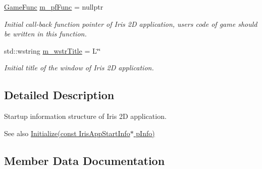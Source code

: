 \begin{DoxyCompactItemize}
\mbox{\label{struct_iris2_d_1_1_iris_application_1_1_iris_app_start_info_a33e7344a1e119e2db1e1a185dd1174f0}} 
\hyperlink{class_iris2_d_1_1_iris_application_ac74720e6cd3a1968f73e92ea99675884}{Game\+Func} \hyperlink{struct_iris2_d_1_1_iris_application_1_1_iris_app_start_info_a33e7344a1e119e2db1e1a185dd1174f0}{m\+\_\+pf\+Func} = nullptr
\begin{DoxyCompactList}\small\item\em Initial call-\/back function pointer of Iris 2D application, user\textquotesingle{}s code of game should be written in this function. \end{DoxyCompactList}\item 
std\+::wstring \hyperlink{struct_iris2_d_1_1_iris_application_1_1_iris_app_start_info_a18a045ecc35ff343a38da429c2e59cdf}{m\+\_\+wstr\+Title} = L\char`\"{}\char`\"{}
\begin{DoxyCompactList}\small\item\em Initial title of the window of Iris 2D application. \end{DoxyCompactList}\end{DoxyCompactItemize}


\subsection{Detailed Description}
Startup information structure of Iris 2D application. 

\begin{DoxySeeAlso}{See also}
\hyperlink{class_iris2_d_1_1_iris_application_ac20656815694f980fccfc4369727a9a9}{Initialize(const Iris\+App\+Start\+Info$\ast$ p\+Info)} 
\end{DoxySeeAlso}


\subsection{Member Data Documentation}
\mbox{\label{struct_iris2_d_1_1_iris_application_1_1_iris_app_start_info_ab52c3d4447fe5c14dbd0f6839dd05032}} 
